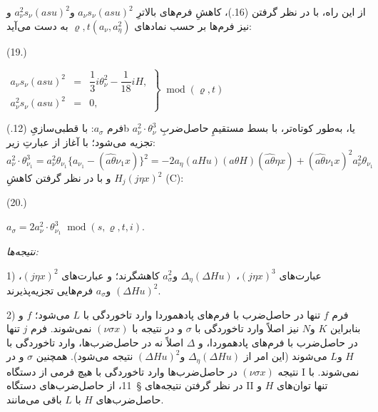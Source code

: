 \documentclass[11pt]{article}
\providecommand{\A}{\Delta}
\providecommand{\R}{\varrho}
\providecommand{\modu}[1]{\;\operatorname{mod} #1}
\begin{document}
از این راه، با در نظر گرفتن (16.)، کاهشِ فرم‌های بالاترِ $a_\nu s_\nu(asu)^2$ و$a_\nu^2s_\nu(asu)^2$ و نیز فرم‌ها بر حسب نمادهای $\R,t(a_\nu,a_\eta^2)$ به دست می‌آید:
\par\smallskip\noindent
\begin{minipage}[c]{4.8em}
\centering (19.)
\end{minipage}%
\begin{minipage}[c]{\dimexpr\linewidth-4.8em\relax}
\centering
\(\displaystyle
\left.\begin{array}{rcl}
a_\nu s_\nu(asu)^2&=&\dfrac13 i\theta_\nu^2-\dfrac1{18}iH,\\[0.5em]
a_\nu^2s_\nu(asu)^2&=&0,
\end{array}\right\}\modu{(\R,t)}
\)
\end{minipage}
\par\smallskip
فرم $a_\sigma$: با قطبی‌سازیِ (12.)b یا، به‌طور کوتاه‌تر، با بسط مستقیمِ حاصل‌ضربِ $a_\nu^2\cdot\theta_\nu^3$ تجزیه می‌شود؛ با آغاز از عبارتِ زیر:
\[
a_\nu^2\cdot\theta_{\nu_1}^3=a_\nu^2\theta_{\nu_1}\{a_{\nu_1}-(\widehat{a\theta}\nu_1x)\}^2
=-2a_\eta(aHu)(a\theta H)(\widehat{a\theta}\eta x)+(\widehat{a\theta}\nu_1x)^2a_\nu^2\theta_{\nu_1}
\]
و با در نظر گرفتن کاهشِ $H_j(j\eta x)^2$ (C):
\par\smallskip\noindent
\begin{minipage}[c]{4.8em}
\centering (20.)
\end{minipage}%
\begin{minipage}[c]{\dimexpr\linewidth-4.8em\relax}
\centering
\(\displaystyle a_\sigma=2a_\nu^2\cdot\theta_{\nu_1}^3\modu{(s,\R,t,i)}.\)
\end{minipage}
\par\smallskip

\noindent\emph{نتیجه‌ها:}

1) عبارت‌های $(j\eta x)^3$، $\A_\eta(\A Hu)$ و$a_\sigma^2$ کاهشگرند؛ و عبارت‌های $(j\eta x)^2$، $(\A Hu)^2$ و$a_\sigma$ فرم‌هایی تجزیه‌پذیرند.

2) فرم $f$ تنها در حاصل‌ضرب با فرم‌های پادهموردا وارد تاخوردگی با $L$ می‌شود؛ $f$ و بنابراین $K$ و$N$ نیز اصلاً وارد تاخوردگی با $\sigma$ و در نتیجه با $(\nu\sigma x)$ نمی‌شوند. فرم $j$ تنها در حاصل‌ضرب با فرم‌های پادهموردا، و $\A$ اصلاً نه در حاصل‌ضرب‌ها، وارد تاخوردگی با $H$ و$L$ می‌شوند (این امر از $\A_\eta(\A Hu)$ و$(\A Hu)^2$ نتیجه می‌شود). همچنین $\sigma$ و در نتیجه $(\nu\sigma x)$ در حاصل‌ضرب‌ها وارد تاخوردگی با هیچ فرمی از دستگاه I نمی‌شوند. با در نظر گرفتن نتیجه‌های \S\ 11، از حاصل‌ضرب‌های دستگاه II تنها توان‌های $H$ و حاصل‌ضرب‌های $H$ با $L$ باقی می‌مانند.
\end{document}
